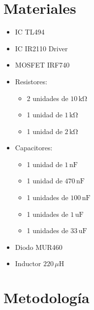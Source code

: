 \documentclass[12pt,a4paper]{article}
\begin{document}
\section{Materiales}

\begin{itemize}
    \item IC TL494
    \item IC IR2110 Driver 
    \item MOSFET IRF740
    \item Resistores:
    \begin{itemize}
    \item 2 unidades de $10\,\mathrm{k\Omega}$
    \item 1 unidad de $1\,\mathrm{k\Omega}$
    \item 1 unidad de $2\,\mathrm{k\Omega}$
\end{itemize}
\item Capacitores:
    \begin{itemize}
    \item 1 unidad de $1\,\mathrm{nF}$
    \item 1 unidad de $470\,\mathrm{nF}$
    \item 1 unidades de $100\,\mathrm{nF}$
    \item 1 unidades de $1\,\mathrm{uF}$
    \item 1 unidades de $33\,\mathrm{uF}$

\end{itemize}
    \item Diodo MUR460
    \item Inductor $220\,\mu\mathrm{H}$
\end{itemize}




\section{Metodología}
 
\end{document}
